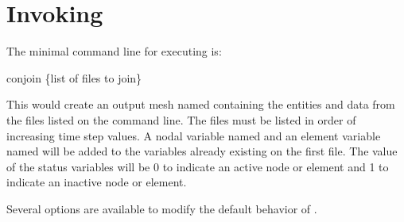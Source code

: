 \section{Invoking \conjoin}
The minimal command line for executing \conjoin{} is:
\begin{syntax}
     conjoin \{list of files to join\}
\end{syntax}
This would create an output mesh named  containing
the entities and data from the files listed on the command line.  The
files must be listed in order of increasing time step values.  A nodal
variable named  and an element variable named
 will be added to the variables already existing
on the first file.  The value of the status variables will be 0 to
indicate an active node or element and 1 to indicate an inactive node
or element.

Several options are available to modify the default behavior of \conjoin{}.

